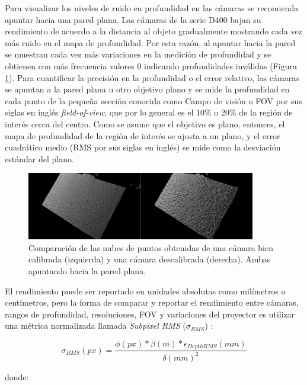 Para visualizar los niveles de ruido en profundidad en las cámaras se recomienda apuntar hacia una pared plana. Las cámaras de la serie D400 bajan su rendimiento de acuerdo a la distancia al objeto gradualmente mostrando cada vez más ruido en el mapa de profundidad. Por esta razón, al apuntar hacia la pared se muestran cada vez más variaciones en la medición de profundidad y se obtienen con más frecuencia valores 0 indicando profundidades inválidas (Figura \ref{fig:calibration}). Para cuantificar la precisión en la profundidad o el error relativo, las cámaras se apuntan a la pared plana u otro objetivo plano y se mide la profundidad en cada punto de la pequeña sección conocida como Campo de visión o FOV por sus siglas en inglés \textit{field-of-view}, que por lo general es el 10\% o 20\% de la región de interés cerca del centro. Como se asume que el objetivo es plano, entonces, el mapa de profundidad de la región de interés se ajusta a un plano, y el error cuadrático medio (RMS por sus siglas en inglés) se mide como la desviación estándar del plano.

\begin{figure}[ht]
	\centering
	\includegraphics[width=10cm]{./Graphics/calibration.png}
	\caption{Comparación de las nubes de puntos obtenidas de una cámara bien calibrada (izquierda) y una cámara descalibrada (derecha). Ambas apuntando hacia la pared plana.}
	\label{fig:calibration}
\end{figure}

El rendimiento puede ser reportado en unidades absolutas como milímetros o centímetros, pero la forma de comparar y reportar el rendimiento entre cámaras, rangos de profundidad, resoluciones, FOV y variaciones del proyector es utilizar una métrica normalizada llamada \textit{Subpixel RMS} ($\sigma_{RMS}$) \cite{grunnet2021intel}:

\begin{equation}
	\sigma_{RMS}(px) = \frac{\phi(px) * \beta(m) * \epsilon_{DepthRMS}(mm)}{\delta(mm)^2}
\end{equation}

donde:


